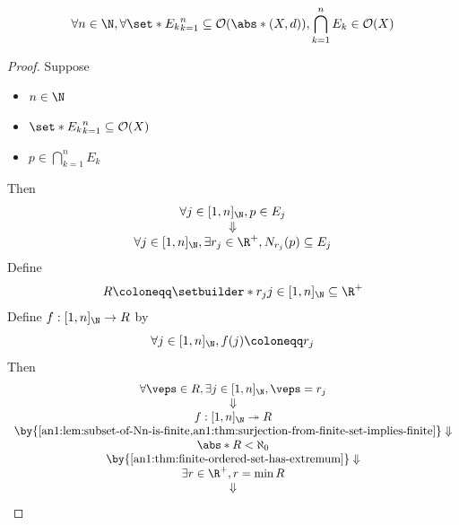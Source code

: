 \begin{theorem} \label{an1:thm:finite-intersection-of-open-sets-is-open}
  \[
    \forall n \in \N, \forall \set*{E_{k}}_{k = 1}^{n} \subseteq \mathcal{O}(\abs*{(X, d)}),
    \bigcap_{k = 1}^{n} E_{k} \in \mathcal{O}(X)
  \]
\end{theorem}

\begin{proof}
  Suppose
  \begin{itemize}
    \item $n \in \N$
    \item $\set*{E_{k}}_{k = 1}^{n} \subseteq \mathcal{O}(X)$
    \item $p \in \bigcap_{k = 1}^{n} E_{k}$
  \end{itemize}
  Then
  \[
    \begin{array}{c}
      \forall j \in [1, n]_{\N}, p \in E_{j} \\
      \Downarrow                             \\
      \forall j \in [1, n]_{\N}, \exists r_{j} \in \R^{+}, N_{r_{j}}(p) \subseteq E_{j}
    \end{array}
  \]
  Define
  \[
    R \coloneqq \setbuilder*{r_{j}}{j \in [1, n]_{\N}} \subseteq \R^{+}
  \]
  Define $f: [1, n]_{\N} \to R$ by
  \[
    \forall j \in [1, n]_{\N}, f(j) \coloneqq r_{j}
  \]
  Then
  \[
    \begin{array}{c}
      \forall \veps \in R, \exists j \in [1, n]_{\N}, \veps = r_{j}                                           \\
      \Downarrow                                                                                              \\
      f: [1, n]_{\N} \twoheadrightarrow R                                                                     \\
      \by{\Cref{an1:lem:subset-of-Nn-is-finite,an1:thm:surjection-from-finite-set-implies-finite}} \Downarrow \\
      \abs*{R} < \aleph_{0}                                                                                   \\
      \by{\Cref{an1:thm:finite-ordered-set-has-extremum}} \Downarrow                                          \\
      \exists r \in \R^{+}, r = \min R                                                                        \\
      \Downarrow                                                                                              \\

\end{array}\]
\end{proof}
